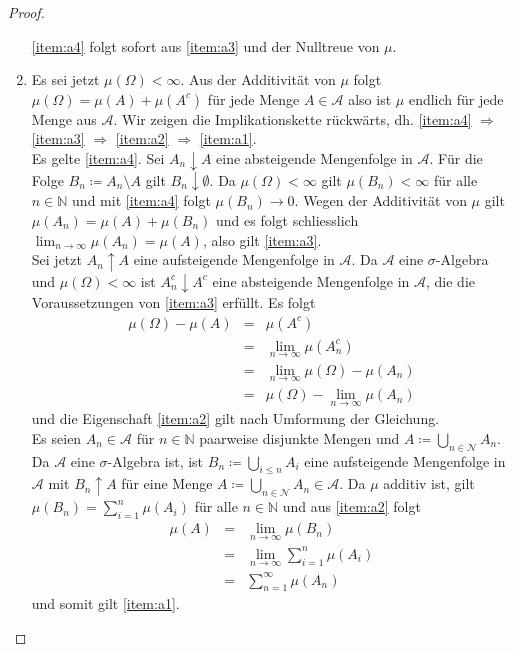 \documentclass[11pt]{amsart}
\begin{document}
\begin{proof}
\begin{enumerate}[label=(\alph{enumi})]
\ref{item:a4} folgt sofort aus \ref{item:a3}  und der Nulltreue von $\mu$. \\

\item Es sei jetzt $\mu(\Omega) < \infty$. Aus der Additivität von $\mu$ folgt $\mu(\Omega) = \mu(A) + \mu(A^c)$ für jede Menge $A \in \mathcal{A}$ also ist $\mu$ endlich für jede Menge aus $\mathcal{A}$. Wir zeigen die Implikationskette rückwärts, dh. \ref{item:a4} $\Rightarrow$  \ref{item:a3} $\Rightarrow$  \ref{item:a2} $\Rightarrow$  \ref{item:a1}. \\

Es gelte \ref{item:a4}.  Sei $A_n \downarrow A$ eine absteigende Mengenfolge in $\mathcal{A}$. Für die Folge $B_n \coloneqq A_n \setminus A$ gilt $B_n \downarrow \emptyset$. Da $\mu(\Omega) < \infty$ gilt $\mu(B_n) < \infty$ für alle $n \in \mathbb{N}$ und mit \ref{item:a4} folgt $\mu(B_n) \rightarrow 0$. Wegen der Additivität von $\mu$ gilt $\mu(A_n) = \mu(A) + \mu(B_n)$ und es folgt schliesslich $\lim_{n \rightarrow \infty} \mu(A_n) = \mu(A)$, also gilt  \ref{item:a3}.\\

Sei jetzt $A_n \uparrow A$ eine aufsteigende Mengenfolge in $\mathcal{A}$. Da $\mathcal{A}$ eine $\sigma$-Algebra und $\mu(\Omega) < \infty$ ist $A_n^c \downarrow A^c$ eine absteigende Mengenfolge in $\mathcal{A}$, die die Voraussetzungen von \ref{item:a3} erfüllt. Es folgt 
\begin{eqnarray*}
\mu(\Omega) - \mu(A) &=& \mu(A^c) \\
&=& \lim_{n \rightarrow \infty} \mu(A_n^c)  \\
&=& \lim_{n \rightarrow \infty} \mu(\Omega) - \mu(A_n) \\
&=& \mu(\Omega) -  \lim_{n \rightarrow \infty} \mu(A_n)
\end{eqnarray*}
und die Eigenschaft \ref{item:a2} gilt nach Umformung der Gleichung.\\

Es seien $A_n \in \mathcal{A}$ für $n \in \mathbb{N}$ paarweise disjunkte Mengen und $A \coloneqq \bigcup_{n \in \mathcal{N}} A_n$. Da $\mathcal{A}$ eine $\sigma$-Algebra ist, ist $B_n \coloneqq \bigcup_{i \leq n} A_i$ eine aufsteigende Mengenfolge in $\mathcal{A}$ mit $B_n \uparrow A$ für eine Menge $A \coloneqq \bigcup_{n \in \mathcal{N}} A_n \in \mathcal{A}$. Da $\mu$ additiv ist, gilt $\mu(B_n) = \sum_{i=1}^n \mu(A_i)$ für alle $n \in \mathbb{N}$ und aus \ref{item:a2} folgt
\begin{eqnarray*}
\mu(A) &=& \lim_{n \rightarrow \infty} \mu(B_n) \\
&=& \lim_{n \rightarrow \infty} \sum_{i=1}^n \mu(A_i) \\
&=& \sum_{n=1}^\infty \mu(A_n)
\end{eqnarray*}
und somit gilt \ref{item:a1}.

\end{enumerate}
\end{proof}
\end{document}
